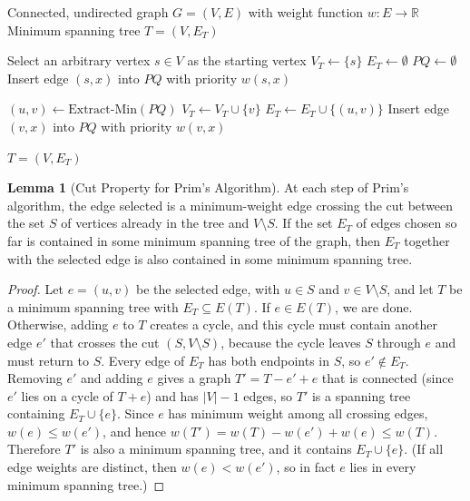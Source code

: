 \documentclass{article}
\theoremstyle{definition}
\newtheorem{lemma}{Lemma}
\begin{document}
\begin{algorithm}
\caption{Prim's Algorithm for Minimum Spanning Tree}
\begin{algorithmic}[1]
\Require Connected, undirected graph $G = (V, E)$ with weight function $w : E \rightarrow \mathbb{R}$
\Ensure Minimum spanning tree $T = (V, E_T)$

    \State Select an arbitrary vertex $s \in V$ as the starting vertex
    \State $V_T \gets \{s\}$ 
    \State $E_T \gets \emptyset$ 
    \State $PQ \gets \emptyset$ 
        \State Insert edge $(s,x)$ into $PQ$ with priority $w(s,x)$
    \EndFor
    
        \State $(u,v) \gets \text{Extract-Min}(PQ)$ 
         
            \State $V_T \gets V_T \cup \{v\}$ 
            \State $E_T \gets E_T \cup \{(u,v)\}$ 
                \State Insert edge $(v,x)$ into $PQ$ with priority $w(v,x)$
            \EndFor
        \EndIf
    \EndWhile
    
    \State \Return $T = (V, E_T)$
\EndProcedure
\end{algorithmic}
\end{algorithm}
\begin{lemma}[Cut Property for Prim's Algorithm]
At each step of Prim's algorithm, the edge selected is a minimum-weight edge crossing the cut between the set $S$ of vertices already in the tree and $V \setminus S$. If the set $E_T$ of edges chosen so far is contained in some minimum spanning tree of the graph, then $E_T$ together with the selected edge is also contained in some minimum spanning tree.
\end{lemma}
\begin{proof}
Let $e = (u,v)$ be the selected edge, with $u \in S$ and $v \in V \setminus S$, and let $T$ be a minimum spanning tree with $E_T \subseteq E(T)$. If $e \in E(T)$, we are done. Otherwise, adding $e$ to $T$ creates a cycle, and this cycle must contain another edge $e'$ that crosses the cut $(S, V \setminus S)$, because the cycle leaves $S$ through $e$ and must return to $S$. Every edge of $E_T$ has both endpoints in $S$, so $e' \notin E_T$. Removing $e'$ and adding $e$ gives a graph $T' = T - e' + e$ that is connected (since $e'$ lies on a cycle of $T + e$) and has $|V| - 1$ edges, so $T'$ is a spanning tree containing $E_T \cup \{e\}$. Since $e$ has minimum weight among all crossing edges, $w(e) \leq w(e')$, and hence $w(T') = w(T) - w(e') + w(e) \leq w(T)$. Therefore $T'$ is also a minimum spanning tree, and it contains $E_T \cup \{e\}$. (If all edge weights are distinct, then $w(e) < w(e')$, so in fact $e$ lies in every minimum spanning tree.)
\end{proof}
\end{document}
